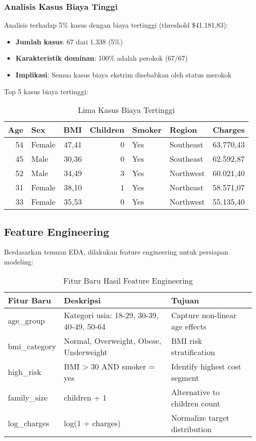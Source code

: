 \subsubsection{Analisis Kasus Biaya Tinggi}
Analisis terhadap 5\% kasus dengan biaya tertinggi (threshold \$41.181,83):

\begin{itemize}
    \item \textbf{Jumlah kasus}: 67 dari 1.338 (5\%)
    \item \textbf{Karakteristik dominan}: 100\% adalah perokok (67/67)
    \item \textbf{Implikasi}: Semua kasus biaya ekstrim disebabkan oleh status merokok
\end{itemize}

Top 5 kasus biaya tertinggi:
\begin{table}[H]
\centering
\caption{Lima Kasus Biaya Tertinggi}
\label{tab:top-charges}
\begin{tabular}{|r|l|r|r|l|l|r|}
\hline
\textbf{Age} & \textbf{Sex} & \textbf{BMI} & \textbf{Children} & \textbf{Smoker} & \textbf{Region} & \textbf{Charges} \\
\hline
54 & Female & 47,41 & 0 & Yes & Southeast & 63.770,43 \\
45 & Male & 30,36 & 0 & Yes & Southeast & 62.592,87 \\
52 & Male & 34,49 & 3 & Yes & Northwest & 60.021,40 \\
31 & Female & 38,10 & 1 & Yes & Northeast & 58.571,07 \\
33 & Female & 35,53 & 0 & Yes & Northwest & 55.135,40 \\
\hline
\end{tabular}
\end{table}

\subsection{Feature Engineering}
\label{subsec:feature-engineering}

Berdasarkan temuan EDA, dilakukan feature engineering untuk persiapan modeling:

\begin{table}[H]
\centering
\caption{Fitur Baru Hasil Feature Engineering}
\label{tab:new-features}
\begin{tabular}{|l|l|l|}
\hline
\textbf{Fitur Baru} & \textbf{Deskripsi} & \textbf{Tujuan} \\
\hline
age\_group & Kategori usia: 18-29, 30-39, 40-49, 50-64 & Capture non-linear age effects \\
bmi\_category & Normal, Overweight, Obese, Underweight & BMI risk stratification \\
high\_risk & BMI > 30 AND smoker = yes & Identify highest cost segment \\
family\_size & children + 1 & Alternative to children count \\
log\_charges & log(1 + charges) & Normalize target distribution \\
\hline
\end{tabular}
\end{table}

